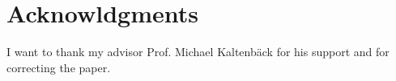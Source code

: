 \section{Acknowldgments}
I want to thank my advisor Prof. Michael Kaltenbäck for his support and for correcting the paper. 